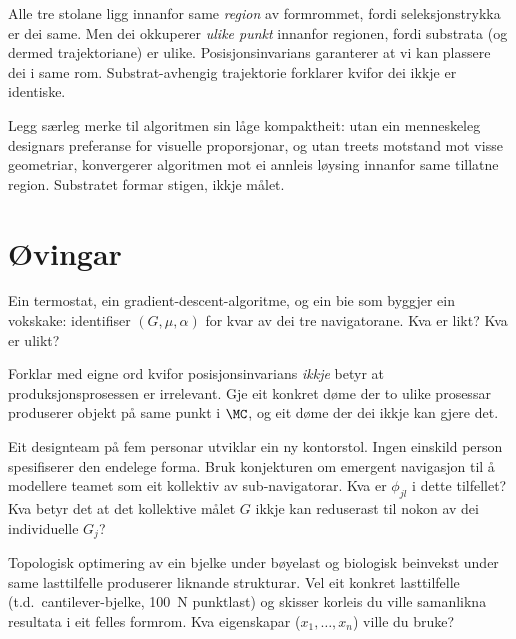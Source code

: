 \medskip
Alle tre stolane ligg innanfor same \emph{region} av formrommet,
fordi seleksjonstrykka er dei same. Men dei okkuperer \emph{ulike
punkt} innanfor regionen, fordi substrata (og dermed
trajektoriane) er ulike. Posisjonsinvarians garanterer at vi kan
plassere dei i same rom. Substrat-avhengig trajektorie forklarer
kvifor dei ikkje er identiske.

Legg særleg merke til algoritmen sin låge kompaktheit: utan ein
menneskeleg designars preferanse for visuelle proporsjonar, og
utan treets motstand mot visse geometriar, konvergerer algoritmen
mot ei annleis løysing innanfor same tillatne region. Substratet
formar stigen, ikkje målet.


\section{Øvingar}

\begin{exercise}[Nivå 1]\label{ex:6.1}
Ein termostat, ein gradient-descent-algoritme, og ein bie som
byggjer ein vokskake: identifiser $(G, \mu, \alpha)$ for kvar av
dei tre navigatorane. Kva er likt? Kva er ulikt?
\end{exercise}

\begin{exercise}[Nivå 1]\label{ex:6.2}
Forklar med eigne ord kvifor posisjonsinvarians \emph{ikkje} betyr
at produksjonsprosessen er irrelevant. Gje eit konkret døme der
to ulike prosessar produserer objekt på same punkt i $\MC$, og eit
døme der dei ikkje kan gjere det.
\end{exercise}

\begin{exercise}[Nivå 2]\label{ex:6.3}
Eit designteam på fem personar utviklar ein ny kontorstol. Ingen
einskild person spesifiserer den endelege forma. Bruk konjekturen
om emergent navigasjon til å modellere teamet som eit kollektiv av
sub-navigatorar. Kva er $\phi_{jl}$ i dette tilfellet? Kva
betyr det at det kollektive målet $G$ ikkje kan reduserast til
nokon av dei individuelle $G_j$?
\end{exercise}

\begin{exercise}[Nivå 2]\label{ex:6.4}
Topologisk optimering av ein bjelke under bøyelast og biologisk
beinvekst under same lasttilfelle produserer liknande strukturar.
Vel eit konkret lasttilfelle (t.d.\ cantilever-bjelke, 100~N
punktlast) og skisser korleis du ville samanlikna resultata i eit
felles formrom. Kva eigenskapar ($x_1, \ldots, x_n$) ville du
bruke?
\end{exercise}

